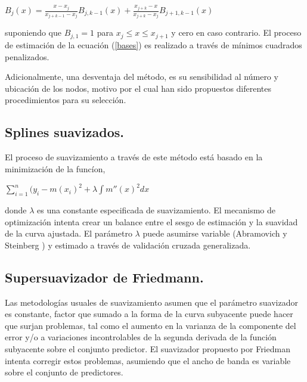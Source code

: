 \vspace*{0.2 cm}


\begin{center}
$\displaystyle{ B_{j}(x) = \frac{x-x_{j}}{x_{j+k-1}-x_{j}} B_{j,k-1}(x) + \frac{x_{j+k}-x}{x_{j+k}-x_{j}} B_{j+1,k-1}(x) }$
\end{center}

\vspace*{0.2 cm}


\noindent suponiendo que $B_{j,1}=1$ para $x_{j} \leq x \leq x_{j+1}$ y cero en caso contrario. El proceso de estimaci\'on de la ecuaci\'on (\ref{bases}) es realizado a trav\'es de m\'inimos cuadrados penalizados.

\hspace*{0.4 cm}Adicionalmente, una desventaja del m\'etodo, es su sensibilidad al n\'umero y ubicaci\'on de los nodos, motivo por el cual han sido propuestos diferentes procedimientos para su selecci\'on.

\subsection{Splines suavizados.\\}



\hspace*{0.4 cm}El proceso de suavizamiento a trav\'es de este m\'etodo est\'a basado en la minimizaci\'on de la func\'ion,

\begin{center}
$\displaystyle{ \sum_{i=1}^{n} (y_{i}-m(x_{i})^2 + \lambda \int m''(x)^2dx  }$
\end{center}

\vspace*{0.2 cm}

\noindent donde $\lambda$ es una constante especificada de suavizamiento. El mecanismo de optimizaci\'on intenta crear un balance entre el sesgo de estimaci\'on y la suavidad de la curva ajustada. El par\'ametro $\lambda$ puede asumirse variable (Abramovich y Steinberg \cite{AS}) y estimado a trav\'es de validaci\'on cruzada generalizada.

\subsection{Supersuavizador de Friedmann.\\}


\hspace*{0.4 cm} Las metodolog\'ias usuales de suavizamiento asumen que el par\'ametro suavizador es constante, factor que sumado a la forma de la curva subyacente puede hacer que surjan problemas, tal como el aumento en la varianza de la componente del error y/o a variaciones incontrolables de la segunda derivada de la funci\'on subyacente sobre el conjunto predictor. El suavizador propuesto por Friedman \cite{F} intenta corregir estos problemas, asumiendo que el ancho de banda es variable sobre el conjunto de predictores.


